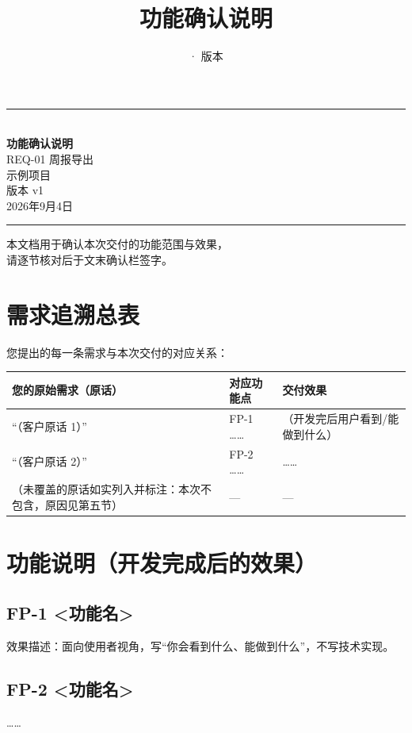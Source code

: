 \documentclass[12pt,a4paper]{ctexart}
\title{\huge\bfseries 功能确认说明\\[0.4em]\Large\color{accent}\docreq}
\author{}
\date{\docdate · 版本 \docversion}
\newcommand{\docproject}{示例项目}        %
\newcommand{\docreq}{REQ-01 周报导出}      %
\newcommand{\docversion}{v1}              %
\newcommand{\docdate}{2026年9月4日}        %
\begin{document}
\begin{titlepage}
\centering
\vspace*{3cm}
{\color{accent}\rule{\textwidth}{2pt}}\\[1.2em]
{\Huge\bfseries 功能确认说明}\\[1.2em]
{\LARGE\color{accent}\docreq}\\[2.4em]
{\Large \docproject}\\[1em]
{\large 版本 \docversion}\\[0.6em]
{\large \docdate}\\[2em]
{\color{accent}\rule{\textwidth}{2pt}}
\vfill
{\small\color{graytext} 本文档用于确认本次交付的功能范围与效果，\\请逐节核对后于文末确认栏签字。}
\vspace*{1.5cm}
\end{titlepage}

\section{需求追溯总表}
您提出的每一条需求与本次交付的对应关系：

\begin{longtable}{>{\raggedright\arraybackslash}p{5.6cm}>{\raggedright\arraybackslash}p{4.2cm}>{\raggedright\arraybackslash}p{4.2cm}}
\toprule
\textbf{您的原始需求（原话）} & \textbf{对应功能点} & \textbf{交付效果} \\
\midrule
“（客户原话 1）” & FP-1 …… & （开发完后用户看到/能做到什么） \\
“（客户原话 2）” & FP-2 …… & …… \\
（未覆盖的原话如实列入并标注：本次不包含，原因见第五节） & — & — \\
\bottomrule
\end{longtable}

\section{功能说明（开发完成后的效果）}

\subsection*{FP-1 <功能名>}
效果描述：面向使用者视角，写“你会看到什么、能做到什么”，不写技术实现。

\subsection*{FP-2 <功能名>}
……
\end{document}
